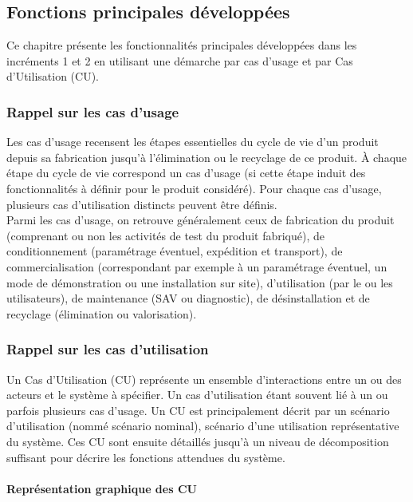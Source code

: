 \newpage
\subsection{Fonctions principales développées} %

Ce chapitre présente les fonctionnalités principales développées dans les incréments 1 et 2 en utilisant
une démarche par cas d'usage et par Cas d’Utilisation (CU).

\subsubsection{Rappel sur les cas d'usage}\label{rappelCasUsage}

Les cas d'usage recensent les étapes essentielles du cycle de vie d'un produit depuis sa fabrication 
jusqu'à l'élimination ou le recyclage de ce produit.
À chaque étape du cycle de vie correspond un cas d'usage (si cette étape induit des
fonctionnalités à définir pour le produit considéré). Pour chaque cas d'usage, plusieurs cas
d'utilisation distincts peuvent être définis. \\

Parmi les cas d'usage, on retrouve généralement ceux de fabrication du produit (comprenant ou
non les activités de test du produit fabriqué), de conditionnement (paramétrage éventuel,
expédition et transport), de commercialisation (correspondant par exemple à un paramétrage éventuel, un mode de démonstration
ou une installation sur site), d'utilisation (par le ou les utilisateurs), de maintenance (SAV ou
diagnostic), de désinstallation et de recyclage (élimination ou valorisation).

\subsubsection{Rappel sur les cas d'utilisation} %

Un Cas d’Utilisation (CU) représente un ensemble d’interactions entre un ou des acteurs et le
système à spécifier. Un cas d'utilisation étant souvent lié à un ou parfois plusieurs cas d'usage.
Un CU est principalement décrit par un scénario d’utilisation (nommé scénario nominal), scénario
d’une utilisation représentative du système. Ces CU sont ensuite détaillés jusqu’à un niveau de
décomposition suffisant pour décrire les fonctions attendues du système.

\paragraph{Représentation graphique des CU} %

